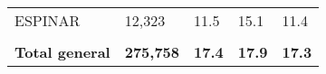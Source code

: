\begin{tabular}{lllll}
	\cellcolor[HTML]{FF5050}ESPINAR                                & 12,323                                                                & 11.5                                                                             & 15.1                                                                        & 11.4                                                                                \\
	&                                                                       &                                                                                  &                                                                             &                                                                                     \\
	\rowcolor[HTML]{DDEBF7} 
	\textbf{Total   general}                                       & \textbf{275,758}                                                      & \textbf{17.4}                                                                    & \textbf{17.9}                                                               & \textbf{17.3}                                                                      
\end{tabular}